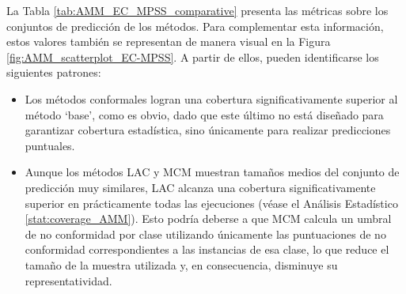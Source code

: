 La Tabla \ref{tab:AMM_EC_MPSS_comparative} presenta las métricas sobre los conjuntos de predicción de los métodos. Para complementar esta información, estos valores también se representan de manera visual en la Figura \ref{fig:AMM_scatterplot_EC-MPSS}. A partir de ellos, pueden identificarse los siguientes patrones:

\begin{itemize}
    
    \item Los métodos conformales logran una cobertura significativamente superior al método `base', como es obvio, dado que este último no está diseñado para garantizar cobertura estadística, sino únicamente para realizar predicciones puntuales.
    
    \item Aunque los métodos LAC y MCM muestran tamaños medios del conjunto de predicción muy similares, LAC alcanza una cobertura significativamente superior en prácticamente todas las ejecuciones (véase el Análisis Estadístico \ref{stat:coverage_AMM}). Esto podría deberse a que MCM calcula un umbral de no conformidad por clase utilizando únicamente las puntuaciones de no conformidad correspondientes a las instancias de esa clase, lo que reduce el tamaño de la muestra utilizada y, en consecuencia, disminuye su representatividad. 

\end{itemize}


